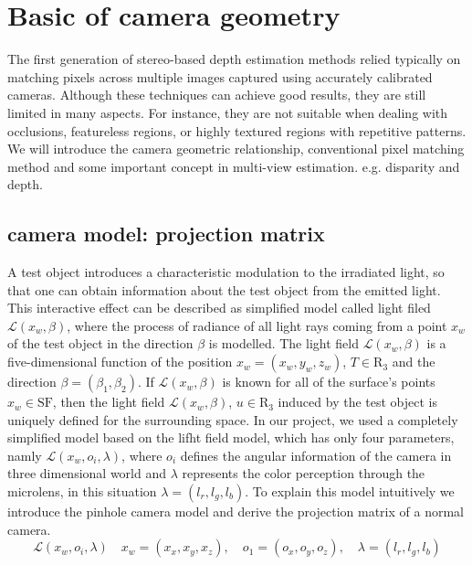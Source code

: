 
\section{Basic of camera geometry}
\label{ch:basic of camera geometry}

The first generation of stereo-based depth estimation methods relied typically on matching pixels across multiple images captured using accurately calibrated cameras. Although these techniques can achieve good results, they are still limited in many aspects. For instance, they are not suitable when dealing with occlusions, featureless regions, or highly textured regions with repetitive patterns. We will introduce the camera geometric relationship, conventional pixel matching method and some important concept in multi-view estimation. e.g. disparity and depth. 

\subsection{camera model: projection matrix}
\label{projection matrix}
A test object introduces a characteristic modulation to the irradiated light, so that one can obtain information about the test object from the emitted light\cite{1400121}. This interactive effect can be described as simplified model called light filed $\mathcal{L}(x_{w}, \beta)$, where the process of radiance of all light rays coming from a point $x_{w}$ of the test object in the direction $\beta$ is modelled. The light field $\mathcal{L}(x_{w}, \beta)$ is a five-dimensional function of the position $x_w = (x_w, y_w, z_w)$, $T \in \mathrm{R}_3$ and the direction $\beta = (\beta_1, \beta_2)$. If $\mathcal{L}(x_{w}, \beta)$ is known for all of the surface’s points $x_w \in \mathrm{SF}$, then the light field $\mathcal{L}(x_{w}, \beta)$, $u \in \mathrm{R}_3$ induced by the test object is uniquely defined for the surrounding space. In our project, we used a completely simplified model based on the lifht field model, which has only four parameters, namly $\mathcal{L}(x_{w}, o_i, \lambda)$, where $o_i$ defines the angular information of the camera in three dimensional world and $\lambda$ represents the color perception through the microlens, in this situation $\lambda = (l_r, l_g, l_b)$. To explain this model intuitively we introduce the pinhole camera model and derive the projection matrix of a normal camera. 
\begin{equation}
\label{eqn:lf_model1}
    \mathcal{L}(x_{w}, o_i, \lambda) \quad x_w=(x_x, x_y,x_z), \quad o_1 = (o_x, o_y, o_z), \quad \lambda = (l_r,l_g,l_b)
\end{equation}

